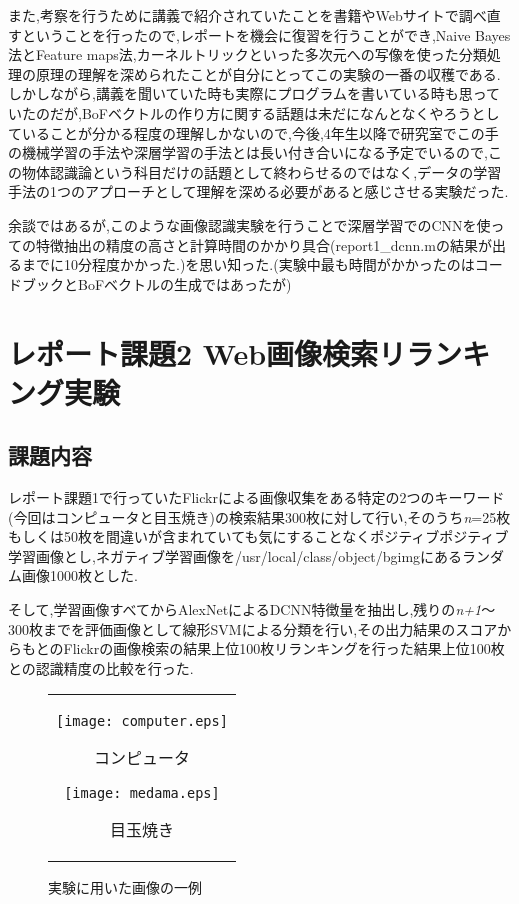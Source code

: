 \documentclass[11pt,a4j]{jreport}
\begin{document}
また,考察を行うために講義で紹介されていたことを書籍やWebサイトで調べ直すということを行ったので,レポートを機会に復習を行うことができ,Naive Bayes法とFeature maps法,カーネルトリックといった多次元への写像を使った分類処理の原理の理解を深められたことが自分にとってこの実験の一番の収穫である.
しかしながら,講義を聞いていた時も実際にプログラムを書いている時も思っていたのだが,BoFベクトルの作り方に関する話題は未だになんとなくやろうとしていることが分かる程度の理解しかないので,今後,4年生以降で研究室でこの手の機械学習の手法や深層学習の手法とは長い付き合いになる予定でいるので,この物体認識論という科目だけの話題として終わらせるのではなく,データの学習手法の1つのアプローチとして理解を深める必要があると感じさせる実験だった.

余談ではあるが,このような画像認識実験を行うことで深層学習でのCNNを使っての特徴抽出の精度の高さと計算時間のかかり具合(report1\_dcnn.mの結果が出るまでに10分程度かかった.)を思い知った.(実験中最も時間がかかったのはコードブックとBoFベクトルの生成ではあったが)

\chapter{レポート課題2 Web画像検索リランキング実験}

\section{課題内容}
レポート課題1で行っていたFlickrによる画像収集をある特定の2つのキーワード(今回はコンピュータと目玉焼き)の検索結果300枚に対して行い,そのうち\textit{n}=25枚もしくは50枚を間違いが含まれていても気にすることなくポジティブポジティブ学習画像とし,ネガティブ学習画像を/usr/local/class/object/bgimgにあるランダム画像1000枚とした.

そして,学習画像すべてからAlexNetによるDCNN特徴量を抽出し,残りの\textit{n+1}〜300枚までを評価画像として線形SVMによる分類を行い,その出力結果のスコアからもとのFlickrの画像検索の結果上位100枚リランキングを行った結果上位100枚との認識精度の比較を行った.
\begin{figure}[htbp]
\begin{center}
  \begin{tabular}{c}
    \begin{minipage}{0.35\hsize}
      \begin{center}
        \texttt{[image: computer.eps]}
      \end{center}
      \hspace{1.5cm}コンピュータ
    \end{minipage}
    \begin{minipage}{0.35\hsize}
      \begin{center}
        \texttt{[image: medama.eps]}
      \end{center}
     \hspace{2.2cm}目玉焼き
    \end{minipage}
  \end{tabular}
  \caption{実験に用いた画像の一例}
\end{center}
\end{figure}
\end{document}
